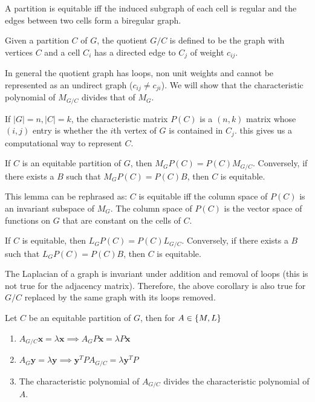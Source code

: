 \documentclass{math}
\renewcommand{\vec}[1]{\boldsymbol{#1}}
\begin{document}
\begin{lemma}
    A partition is equitable iff the induced subgraph of each cell is regular and the edges between two cells form a biregular graph.
\end{lemma}

\begin{definition}
    Given a partition $C$ of $G$, the quotient $G/C$ is defined to be the graph with vertices $C$ and a cell $C_i$ has a directed edge to $C_j$ of weight $c_{ij}$.
\end{definition}

In general the quotient graph has loops, non unit weights and cannot be represented as an undirect graph ($c_{ij} \neq c_{ji}$).
We will show that the characteristic polynomial of $M_{G/C}$ divides that of $M_{G}$.

If $|G| = n, |C| = k$, the characteristic matrix $P(C)$ is a $(n,k)$ matrix whose $(i, j)$ entry is whether the $i$th vertex of $G$ is contained in $C_j$.
this gives us a computational way to represent $C$.

\begin{lemma}
    If $C$ is an equitable partition of $G$, then $M_{G}P(C) = P(C)M_{G/C}$. Conversely, if there exists a $B$ such that $M_G P(C) = P(C) B$, then $C$ is equitable.
\end{lemma}

This lemma can be rephrased as: $C$ is equitable iff the column space of $P(C)$ is an invariant subspace of $M_G$.
The column space of $P(C)$ is the vector space of functions on $G$ that are constant on the cells of $C$.

\begin{corollary}
    If $C$ is equitable, then $L_{G}P(C) = P(C)L_{G/C}$. Conversely, if there exists a $B$ such that $L_G P(C) = P(C) B$, then $C$ is equitable.
\end{corollary}

The Laplacian of a graph is invariant under addition and removal of loops (this is not true for the adjacency matrix).
Therefore, the above corollary is also true for $G/C$ replaced by the same graph with its loops removed.

\begin{theorem}
    Let $C$ be an equitable partition of $G$, then for $A \in \{ M, L \}$
    \begin{enumerate}
        \item $A_{G/C}\vec{x} = \lambda \vec{x} \implies A_GP\vec{x} = \lambda P \vec{x}$
        \item $A_G \vec{y} = \lambda \vec{y} \implies \vec{y}^T P A_{G/C} = \lambda \vec{y}^T P$
        \item The characteristic polynomial of $A_{G/C}$ divides the characteristic polynomial of $A$.
    \end{enumerate}
\end{theorem}
\end{document}
